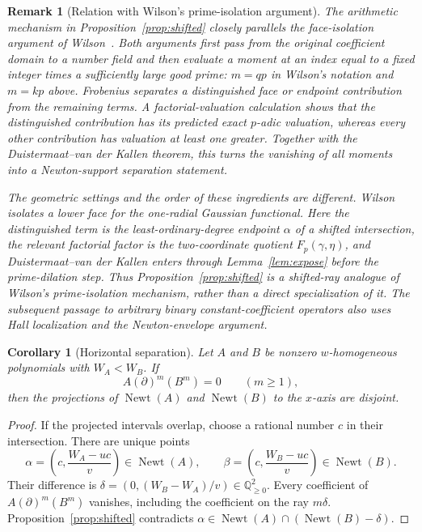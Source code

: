 \documentclass[11pt]{article}
\newtheorem{corollary}[theorem]{Corollary}
\newtheorem{remark}[theorem]{Remark}
\newcommand{\Q}{\mathbb Q}
\newcommand{\Newt}{\operatorname{Newt}}
\begin{document}
\begin{remark}[Relation with Wilson's prime-isolation argument]
The arithmetic mechanism in Proposition~\ref{prop:shifted} closely parallels
the face-isolation argument of Wilson~\cite{WilsonGMC}.  Both arguments
first pass from the original coefficient domain to a number field and then
evaluate a moment at an index equal to a fixed integer times a sufficiently
large good prime: $m=qp$ in Wilson's notation and $m=kp$ above.
Frobenius separates a distinguished face or endpoint contribution from the
remaining terms.  A factorial-valuation calculation shows that the
distinguished contribution has its predicted exact $p$-adic valuation,
whereas every other contribution has valuation at least one greater.
Together with the Duistermaat--van der Kallen theorem, this turns the
vanishing of all moments into a Newton-support separation statement.

The geometric settings and the order of these ingredients are different.
Wilson isolates a lower face for the one-radial Gaussian functional.  Here
the distinguished term is the least-ordinary-degree endpoint $\alpha$ of a
shifted intersection, the relevant factorial factor is the two-coordinate
quotient $F_p(\gamma,\eta)$, and Duistermaat--van der Kallen enters through
Lemma~\ref{lem:expose} before the prime-dilation step.  Thus
Proposition~\ref{prop:shifted} is a shifted-ray analogue of Wilson's
prime-isolation mechanism, rather than a direct specialization of it.
The subsequent passage to arbitrary binary constant-coefficient operators
also uses Hall localization and the Newton-envelope argument.
\end{remark}

\begin{corollary}[Horizontal separation]\label{cor:horizontal}
Let $A$ and $B$ be nonzero $w$-homogeneous polynomials with
$W_A<W_B$.  If
\[
 A(\partial)^m(B^m)=0\qquad(m\geq1),
\]
then the projections of $\Newt(A)$ and $\Newt(B)$ to the $x$-axis are
disjoint.
\end{corollary}

\begin{proof}
If the projected intervals overlap, choose a rational number $c$ in their
intersection.  There are unique points
\[
 \alpha=\left(c,\frac{W_A-uc}{v}\right)\in\Newt(A),
 \qquad
 \beta=\left(c,\frac{W_B-uc}{v}\right)\in\Newt(B).
\]
Their difference is
$\delta=(0,(W_B-W_A)/v)\in\Q_{\geq0}^2$.  Every coefficient of
$A(\partial)^m(B^m)$ vanishes, including the coefficient on the ray
$m\delta$.  Proposition~\ref{prop:shifted} contradicts
$\alpha\in\Newt(A)\cap(\Newt(B)-\delta)$.
\end{proof}
\end{document}
